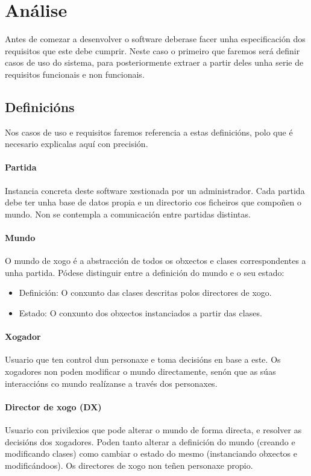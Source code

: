 \chapter{Análise}

Antes de comezar a desenvolver o software deberase facer unha especificación dos
requisitos que este debe cumprir. Neste caso o primeiro que faremos será definir
casos de uso do sistema, para posteriormente extraer a partir deles unha serie
de requisitos funcionais e non funcionais.

\section{Definicións}
Nos casos de uso e requisitos faremos referencia a estas definicións, polo que é
necesario explicalas aquí con precisión.

\subsubsection{Partida}
Instancia concreta deste software xestionada por un administrador. Cada partida
debe ter unha base de datos propia e un directorio cos ficheiros que compoñen o
mundo. Non se contempla a comunicación entre partidas distintas.

\subsubsection{Mundo}
O mundo de xogo é a abstracción de todos os obxectos e clases correspondentes a
unha partida. Pódese distinguir entre a definición do mundo e o seu estado:
\begin{itemize}
\item Definición: O conxunto das clases descritas polos directores de xogo.
\item Estado: O conxunto dos obxectos instanciados a partir das clases.
\end{itemize}

\subsubsection{Xogador}
Usuario que ten control dun personaxe e toma decisións en base a este. Os
xogadores non poden modificar o mundo directamente, senón que as súas
interaccións co mundo realízanse a través dos personaxes.

\subsubsection{Director de xogo (DX)}
Usuario con privilexios que pode alterar o mundo de forma directa, e resolver as
decisións dos xogadores. Poden tanto alterar a definición do mundo (creando e
modificando clases) como cambiar o estado do mesmo (instanciando obxectos e
modificándoos). Os directores de xogo non teñen personaxe propio.

